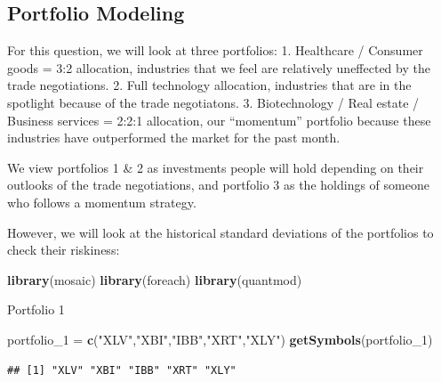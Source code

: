 \documentclass[]{article}
\newenvironment{Shaded}{\begin{snugshade}}{\end{snugshade}}
\newcommand{\DecValTok}[1]{\textcolor[rgb]{0.00,0.00,0.81}{#1}}
\newcommand{\KeywordTok}[1]{\textcolor[rgb]{0.13,0.29,0.53}{\textbf{#1}}}
\newcommand{\NormalTok}[1]{#1}
\newcommand{\StringTok}[1]{\textcolor[rgb]{0.31,0.60,0.02}{#1}}
\begin{document}
\hypertarget{portfolio-modeling}{%
\subsection{Portfolio Modeling}\label{portfolio-modeling}}

For this question, we will look at three portfolios: 1. Healthcare /
Consumer goods = 3:2 allocation, industries that we feel are relatively
uneffected by the trade negotiations. 2. Full technology allocation,
industries that are in the spotlight because of the trade negotiatons.
3. Biotechnology / Real estate / Business services = 2:2:1 allocation,
our ``momentum'' portfolio because these industries have outperformed
the market for the past month.

We view portfolios 1 \& 2 as investments people will hold depending on
their outlooks of the trade negotiations, and portfolio 3 as the
holdings of someone who follows a momentum strategy.

However, we will look at the historical standard deviations of the
portfolios to check their riskiness:

\begin{Shaded}
\begin{Highlighting}[]
\KeywordTok{library}\NormalTok{(mosaic)}
\KeywordTok{library}\NormalTok{(foreach)}
\KeywordTok{library}\NormalTok{(quantmod)}
\end{Highlighting}
\end{Shaded}

Portfolio 1

\begin{Shaded}
\begin{Highlighting}[]
\NormalTok{portfolio_}\DecValTok{1}\NormalTok{ =}\StringTok{ }\KeywordTok{c}\NormalTok{(}\StringTok{"XLV"}\NormalTok{,}\StringTok{"XBI"}\NormalTok{,}\StringTok{"IBB"}\NormalTok{,}\StringTok{"XRT"}\NormalTok{,}\StringTok{"XLY"}\NormalTok{)}
\KeywordTok{getSymbols}\NormalTok{(portfolio_}\DecValTok{1}\NormalTok{)}
\end{Highlighting}
\end{Shaded}

\begin{verbatim}
## [1] "XLV" "XBI" "IBB" "XRT" "XLY"
\end{verbatim}
\end{document}

